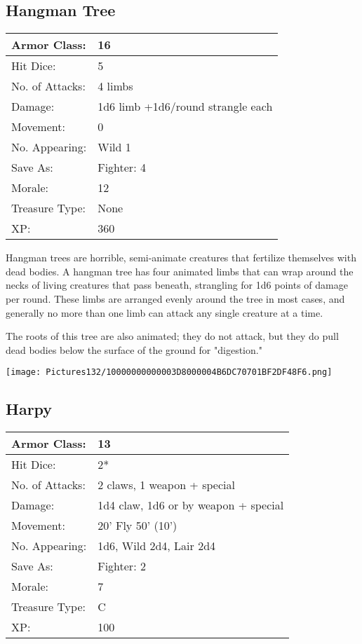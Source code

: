 \documentclass[a4paper,twoside,openany,10pt]{book}
\begin{document}
\begin{multicols}{2}
\subsection*{Hangman Tree}\label{hangman-tree}

\begin{tabularx}{0.48\textwidth}{@{}lX@{}}
Armor Class: & 16 \\\hline
Hit Dice: & 5 \\\hline
No. of Attacks: & 4 limbs \\\hline
Damage: & 1d6 limb +1d6/round strangle each \\\hline
Movement: & 0 \\\hline
No. Appearing: & Wild 1 \\\hline
Save As: & Fighter: 4 \\\hline
Morale: & 12 \\\hline
Treasure Type: & None \\\hline
XP: & 360 \\\hline
\end{tabularx}\medskip

Hangman trees are horrible, semi-animate creatures that fertilize themselves with dead bodies. A hangman tree has four animated limbs that can wrap around the necks of living creatures that pass beneath, strangling for 1d6 points of damage per round. These limbs are arranged evenly around the tree in most cases, and generally no more than one limb can attack any single creature at a time.

The roots of this tree are also animated; they do not attack, but they do pull dead bodies below the surface of the ground for "digestion."

\begin{center}
	\texttt{[image: Pictures132/10000000000003D8000004B6DC70701BF2DF48F6.png]}
\end{center}

\subsection*{Harpy}\label{harpy}

\begin{tabularx}{0.48\textwidth}{@{}lX@{}}
Armor Class: & 13 \\\hline
Hit Dice: & 2* \\\hline
No. of Attacks: & 2 claws, 1 weapon + special \\\hline
Damage: & 1d4 claw, 1d6 or by weapon + special \\\hline
Movement: & 20' Fly 50'
(10') \\\hline
No. Appearing: & 1d6, Wild 2d4, Lair 2d4 \\\hline
Save As: & Fighter: 2 \\\hline
Morale: & 7 \\\hline
Treasure Type: & C \\\hline
XP: & 100 \\\hline
\end{tabularx}\medskip


\end{multicols}
\end{document}
